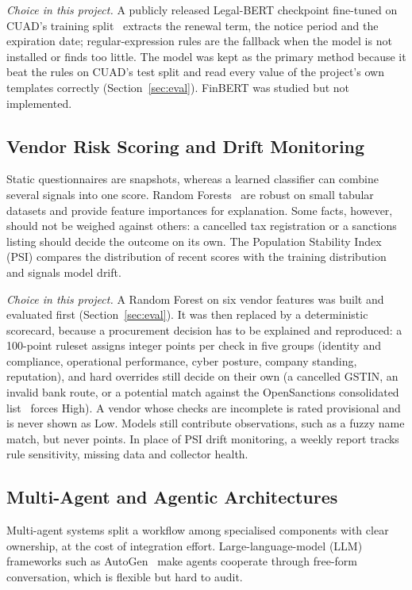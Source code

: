 \emph{Choice in this project.} A publicly released Legal-BERT checkpoint fine-tuned on CUAD's training split~\cite{apostolo2023legalbertcuad} extracts the renewal term, the notice period and the expiration date; regular-expression rules are the fallback when the model is not installed or finds too little. The model was kept as the primary method because it beat the rules on CUAD's test split and read every value of the project's own templates correctly (Section~\ref{sec:eval}). FinBERT was studied but not implemented.

\subsection{Vendor Risk Scoring and Drift Monitoring}
Static questionnaires are snapshots, whereas a learned classifier can combine several signals into one score. Random Forests~\cite{breiman2001random} are robust on small tabular datasets and provide feature importances for explanation. Some facts, however, should not be weighed against others: a cancelled tax registration or a sanctions listing should decide the outcome on its own. The Population Stability Index (PSI) compares the distribution of recent scores with the training distribution and signals model drift.

\emph{Choice in this project.} A Random Forest on six vendor features was built and evaluated first (Section~\ref{sec:eval}). It was then replaced by a deterministic scorecard, because a procurement decision has to be explained and reproduced: a 100-point ruleset assigns integer points per check in five groups (identity and compliance, operational performance, cyber posture, company standing, reputation), and hard overrides still decide on their own (a cancelled GSTIN, an invalid bank route, or a potential match against the OpenSanctions consolidated list~\cite{opensanctions} forces High). A vendor whose checks are incomplete is rated provisional and is never shown as Low. Models still contribute observations, such as a fuzzy name match, but never points. In place of PSI drift monitoring, a weekly report tracks rule sensitivity, missing data and collector health.

\subsection{Multi-Agent and Agentic Architectures}
\label{sec:agentdef}
Multi-agent systems split a workflow among specialised components with clear ownership, at the cost of integration effort. Large-language-model (LLM) frameworks such as AutoGen~\cite{wu2023autogen} make agents cooperate through free-form conversation, which is flexible but hard to audit.

